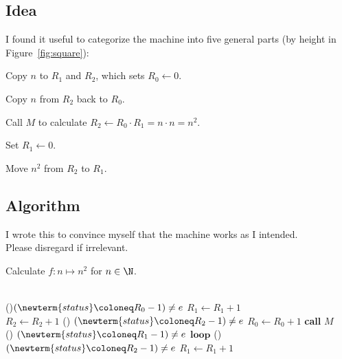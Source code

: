 \begin{problem}
\begin{answer}
    \newpage
    \subsection*{Idea}
    I found it useful to categorize the machine into five general parts
    (by height in Figure~\ref{fig:square}):

    \begin{enumarabic}
      \item {}
      \item Copy $n$ to $R_1$ and $R_2$, which sets $R_0 \gets 0$.
      \item Copy $n$ from $R_2$ back to $R_0$.
      \item Call $M$ to calculate $R_2 \gets R_0 \cdot R_1 = n \cdot n = n^2$.
      \item Set $R_1 \gets 0$.
      \item Move $n^2$ from $R_2$ to $R_1$.
      \item {}
    \end{enumarabic}
    \subsection*{Algorithm}
    I wrote this to convince myself that the machine works as I intended. \\
    Please disregard if irrelevant.

    \step
    \begin{algorithm}[H]
      \caption{Calculate $f: n \mapsto n^2$ for $n \in \N$.}
         \\
        \While(){$(\newterm{status} \coloneq R_0 - 1) \neq e$}{
          $R_1 \gets R_1 + 1$ \\
          $R_2 \gets R_2 + 1$
        }
        \While() {$(\newterm{status} \coloneq R_2 - 1) \neq e$}{
          $R_0 \gets R_0 + 1$
        }
        \textbf{call} $M$  \\
        \While() {$(\newterm{status} \coloneq R_1 - 1) \neq e$}{
          $\mathbf{loop}$
        }
        \While() {$(\newterm{status} \coloneq R_2 - 1) \neq e$}{
          $R_1 \gets R_1 + 1$
        }
    \end{algorithm}
  \end{answer}
\end{problem}
